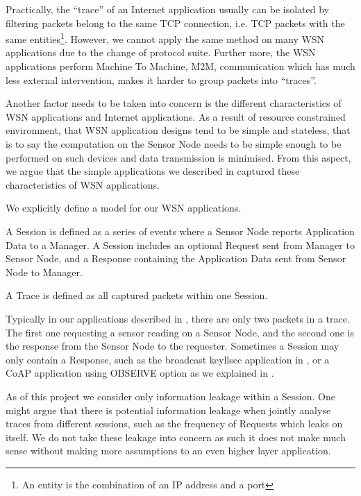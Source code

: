 Practically, the ``trace'' of an Internet application usually can be isolated by filtering packets belong to the same TCP connection, i.e. TCP packets with the same entities\footnote{An entity is the combination of an IP address and a port}. However, we cannot apply the same method on many WSN applications due to the change of protocol suite. Further more, the WSN applications perform Machine To Machine, M2M, communication which has much less external intervention, makes it harder to group packets into ``traces''.

Another factor needs to be taken into concern is the different characteristics of WSN applications and Internet applications. As a result of resource constrained environment, that WSN application designs tend to be simple and stateless, that is to say the computation on the Sensor Node needs to be simple enough to be performed on such devices and data transmission is minimised. From this aspect, we argue that the simple applications we described in  captured these characteristics of WSN applications.  

We explicitly define a model for our WSN applications.

\begin{definition} \label{Def: Session}
A Session is defined as a series of events where a Sensor Node reports Application Data to a Manager. A Session includes an optional Request sent from Manager to Sensor Node, and a Response containing the Application Data sent from Sensor Node to Manager.
\end{definition}

\begin{definition} \label{Def: Trace}
A Trace is defined as all captured packets within one Session.
\end{definition}

Typically in our applications described in , there are only two packets in a trace. The first one requesting a sensor reading on a Sensor Node, and the second one is the response from the Sensor Node to the requester. Sometimes a Session may only contain a Response, such as the broadcast keyllsec application in , or a CoAP application using OBSERVE option as we explained in .

As of this project we consider only information leakage within a Session. One might argue that there is potential information leakage when jointly analyse traces from different sessions, such as the frequency of Requests which leaks on itself. We do not take these leakage into concern as such it does not make much sense without making more assumptions to an even higher layer application.

